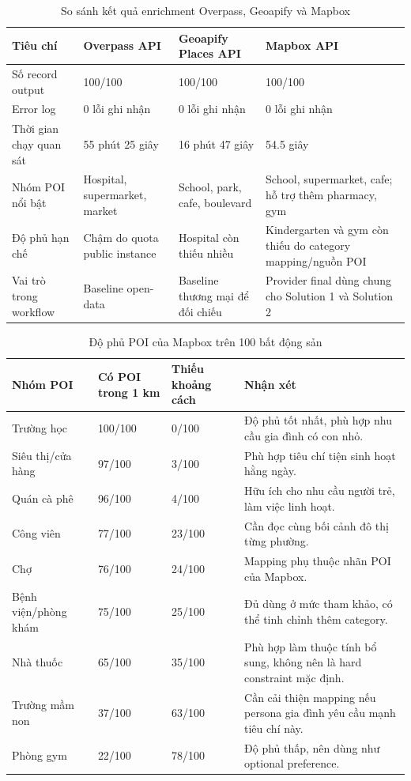 \documentclass[a4paper,12pt]{article}
\begin{document}
\begin{table}[H]
\centering
\caption{So sánh kết quả enrichment Overpass, Geoapify và Mapbox}
\label{tab:tien_provider_compare}
\scriptsize
\begin{tabularx}{\textwidth}{|P{3.0cm}|P{3.2cm}|P{3.2cm}|Y|}
\hline
\textbf{Tiêu chí} & \textbf{Overpass API} & \textbf{Geoapify Places API} & \textbf{Mapbox API} \\ \hline
Số record output & 100/100 & 100/100 & 100/100 \\ \hline
Error log & 0 lỗi ghi nhận & 0 lỗi ghi nhận & 0 lỗi ghi nhận \\ \hline
Thời gian chạy quan sát & 55 phút 25 giây & 16 phút 47 giây & 54.5 giây \\ \hline
Nhóm POI nổi bật & Hospital, supermarket, market & School, park, cafe, boulevard & School, supermarket, cafe; hỗ trợ thêm pharmacy, gym \\ \hline
Độ phủ hạn chế & Chậm do quota public instance & Hospital còn thiếu nhiều & Kindergarten và gym còn thiếu do category mapping/nguồn POI \\ \hline
Vai trò trong workflow & Baseline open-data & Baseline thương mại để đối chiếu & Provider final dùng chung cho Solution 1 và Solution 2 \\ \hline
\end{tabularx}
\end{table}
\normalsize

\begin{table}[H]
\centering
\caption{Độ phủ POI của Mapbox trên 100 bất động sản}
\label{tab:mapbox_coverage}
\small
\begin{tabularx}{\textwidth}{|P{3.6cm}|P{3.0cm}|P{3.1cm}|Y|}
\hline
\textbf{Nhóm POI} & \textbf{Có POI trong 1 km} & \textbf{Thiếu khoảng cách} & \textbf{Nhận xét} \\ \hline
Trường học & 100/100 & 0/100 & Độ phủ tốt nhất, phù hợp nhu cầu gia đình có con nhỏ. \\ \hline
Siêu thị/cửa hàng & 97/100 & 3/100 & Phù hợp tiêu chí tiện sinh hoạt hằng ngày. \\ \hline
Quán cà phê & 96/100 & 4/100 & Hữu ích cho nhu cầu người trẻ, làm việc linh hoạt. \\ \hline
Công viên & 77/100 & 23/100 & Cần đọc cùng bối cảnh đô thị từng phường. \\ \hline
Chợ & 76/100 & 24/100 & Mapping phụ thuộc nhãn POI của Mapbox. \\ \hline
Bệnh viện/phòng khám & 75/100 & 25/100 & Đủ dùng ở mức tham khảo, có thể tinh chỉnh thêm category. \\ \hline
Nhà thuốc & 65/100 & 35/100 & Phù hợp làm thuộc tính bổ sung, không nên là hard constraint mặc định. \\ \hline
Trường mầm non & 37/100 & 63/100 & Cần cải thiện mapping nếu persona gia đình yêu cầu mạnh tiêu chí này. \\ \hline
Phòng gym & 22/100 & 78/100 & Độ phủ thấp, nên dùng như optional preference. \\ \hline
\end{tabularx}
\end{table}
\end{document}
